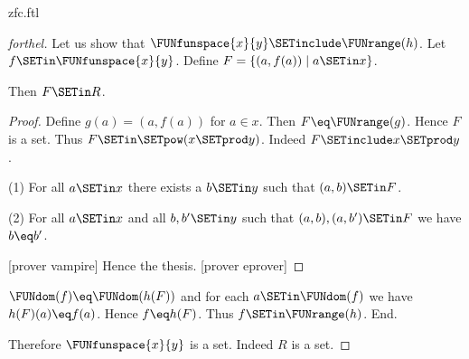 \documentclass{naproche-library}
\begin{document}
\begin{smodule}[title=ZFC]{zfc.ftl}
\begin{proof}[forthel]
  Let us show that $\FUNfunspace{x}{y} \SETinclude \FUNrange(h)$.
    Let $f \SETin \FUNfunspace{x}{y}$.
    Define $F = \{ (a,f(a)) \mid a \SETin x \}$.

    Then $F \SETin R$.
    \begin{proof}
      Define $g(a) = (a,f(a))$ for $a \in x$.
      Then $F \eq \FUNrange(g)$.
      Hence $F$ is a set.
      Thus $F \SETin \SETpow(x \SETprod y)$.
      Indeed $F \SETinclude x \SETprod y$.

      (1) For all $a \SETin x$ there exists a $b \SETin y$ such that $(a,b) \SETin F$.

      (2) For all $a \SETin x$ and all $b, b' \SETin y$ such that $(a,b),
      (a,b') \SETin F$ we have $b \eq b'$.

      [prover vampire]
      Hence the thesis.
      [prover eprover]
    \end{proof}

    $\FUNdom(f) \eq \FUNdom(h(F))$ and for each $a \SETin \FUNdom(f)$ we have $h(F)(a) \eq f(a)$.
    Hence $f \eq h(F)$.
    Thus $f \SETin \FUNrange(h)$.
  End.

  Therefore $\FUNfunspace{x}{y}$ is a set.
  Indeed $R$ is a set.
\end{proof}
\end{smodule}
\end{document}
